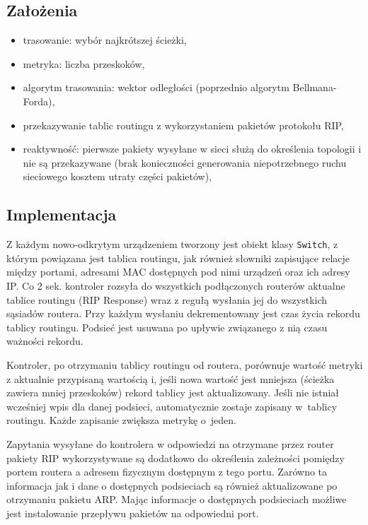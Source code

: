 \documentclass{article}
\begin{document}
	\subsection{Założenia}
	\begin{itemize}
		\item trasowanie: wybór najkrótszej ścieżki,
		\item metryka: liczba przeskoków,
		\item algorytm trasowania: wektor odległości (poprzednio algorytm Bellmana-Forda),
		\item przekazywanie tablic routingu z wykorzystaniem pakietów protokołu RIP,
		\item reaktywność: pierwsze pakiety wysyłane w sieci służą do określenia topologii i nie są przekazywane (brak konieczności generowania niepotrzebnego ruchu sieciowego kosztem utraty części pakietów),
	\end{itemize}
	
	\subsection{Implementacja}	
	Z każdym nowo-odkrytym urządzeniem tworzony jest obiekt klasy \texttt{Switch}, z którym powiązana jest tablica routingu, jak również słowniki zapisujące relacje między portami, adresami MAC dostępnych pod nimi urządzeń oraz ich adresy IP. Co 2 sek. kontroler rozsyła do wszystkich podłączonych routerów aktualne tablice routingu (RIP Response) wraz z regułą wysłania jej do wszystkich sąsiadów routera. Przy każdym wysłaniu dekrementowany jest czas życia rekordu tablicy routingu. Podsieć jest usuwana po upływie związanego z nią czasu ważności rekordu.
	
	Kontroler, po otrzymaniu tablicy routingu od routera, porównuje wartość metryki z aktualnie przypisaną wartością i, jeśli nowa wartość jest mniejsza (ścieżka zawiera mniej przeskoków) rekord tablicy jest aktualizowany. Jeśli nie istniał wcześniej wpis dla danej podsieci, automatycznie zostaje zapisany w~tablicy routingu. Każde zapisanie zwiększa metrykę o~jeden.
	
	Zapytania wysyłane do kontrolera w odpowiedzi na otrzymane przez router pakiety RIP wykorzystywane są dodatkowo do określenia zależności pomiędzy portem routera a adresem fizycznym dostępnym z tego portu. Zarówno ta informacja jak i dane o dostępnych podsieciach są również aktualizowane po otrzymaniu pakietu ARP. Mając informacje o dostępnych podsieciach możliwe jest instalowanie przepływu pakietów na odpowiedni port.
	
\end{document}
